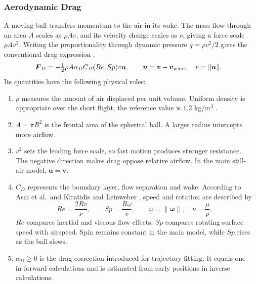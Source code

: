 \documentclass[12pt,letterpaper]{article}
\begin{document}
\subsubsection{Aerodynamic Drag}\label{sec:drag}
A moving ball transfers momentum to the air in its wake. The mass flow through an area $A$ scales as $\rho Av$, and its velocity change scales as $v$, giving a force scale $\rho Av^2$. Writing the proportionality through dynamic pressure $q=\rho v^2/2$ gives the conventional drag expression \cite{goff2009,kiratidis2018},
\begin{equation}
\boldsymbol F_D=-\tfrac12\rho A\alpha_D C_D(Re,Sp)v\boldsymbol u,
\qquad \boldsymbol u=\boldsymbol v-\boldsymbol v_{\rm wind},\quad v=\|\boldsymbol u\|.
\label{eq:drag-force}\end{equation}
Its quantities have the following physical roles:
\begin{enumerate}
\item $\rho$ measures the amount of air displaced per unit volume. Uniform density is appropriate over the short flight; the reference value is $1.2$ kg/m$^3$ \cite{asai2007}.
\item $A=\pi R^2$ is the frontal area of the spherical ball. A larger radius intercepts more airflow.
\item $v^2$ sets the leading force scale, so fast motion produces stronger resistance. The negative direction makes drag oppose relative airflow. In the main still-air model, $\boldsymbol u=\boldsymbol v$.
\item $C_D$ represents the boundary layer, flow separation and wake. According to Asai et al.\ and Kiratidis and Leinweber \cite{asai2007,kiratidis2018}, speed and rotation are described by
\begin{equation}
Re=\frac{2Rv}{\nu},\qquad Sp=\frac{R\omega}{v},\qquad
\omega=\|\boldsymbol\omega\|,\quad\nu=\frac{\mu}{\rho}.
\label{eq:re-sp}\end{equation}
$Re$ compares inertial and viscous flow effects; $Sp$ compares rotating surface speed with airspeed. Spin remains constant in the main model, while $Sp$ rises as the ball slows.
\item $\alpha_D\geq0$ is the drag correction introduced for trajectory fitting. It equals one in forward calculations and is estimated from early positions in inverse calculations.
\end{enumerate}
\end{document}
